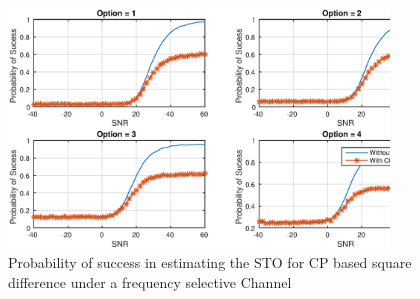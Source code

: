 


\begin{figure}[hbt]
  \centering
    \includegraphics[width=0.9\textwidth]
      {./figures/p_sucess_sto_diff_cps}
  \caption{Probability of success in estimating the STO for CP based square difference under a frequency selective Channel}
  \label{fig:sto_esti_cp_diff_chn}
\end{figure}


